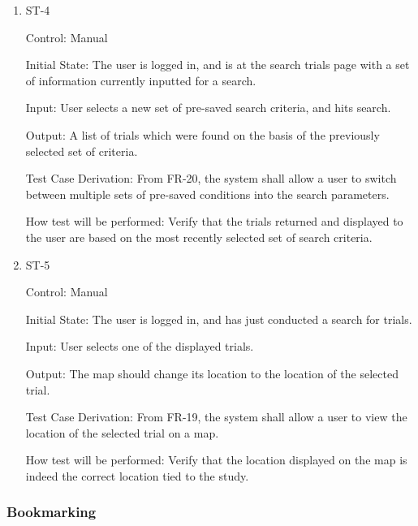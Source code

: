\documentclass[12pt, titlepage]{article}
\begin{document}
\begin{enumerate}
\item{ST-4\\}

Control: Manual
					
Initial State: The user is logged in, and is at the search trials page with a set of information currently inputted for a search.
					
Input: User selects a new set of pre-saved search criteria, and hits search.
					
Output: A list of trials which were found on the basis of the previously selected set of criteria.

Test Case Derivation: From FR-20, the system shall allow a user to switch between multiple sets of pre-saved conditions into the search parameters.

How test will be performed: Verify that the trials returned and displayed to the user are based on the most recently selected set of 
search criteria.

\item{ST-5\\}

Control: Manual
					
Initial State: The user is logged in, and has just conducted a search for trials.
					
Input: User selects one of the displayed trials.
					
Output: The map should change its location to the location of the selected trial.

Test Case Derivation: From FR-19, the system shall allow a user to view the location of the selected trial on a map.

How test will be performed: Verify that the location displayed on the map is indeed the correct location tied to the study.


\end{enumerate}


\subsubsection{Bookmarking}
\end{document}
